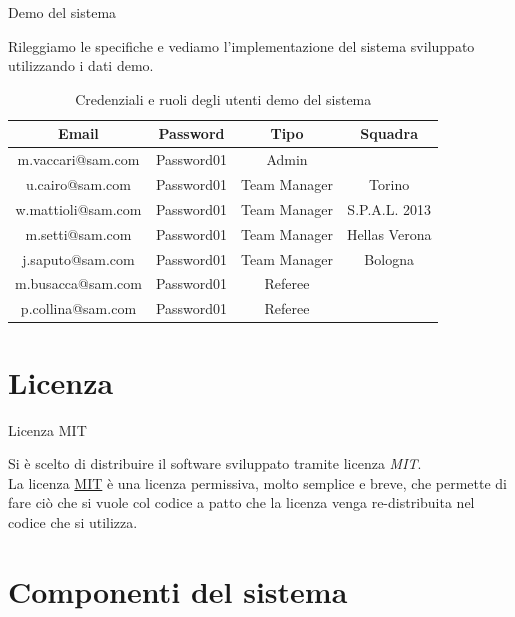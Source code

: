 \documentclass[10pt]{beamer}
\begin{document}
\begin{frame}{Demo del sistema}

Rileggiamo le specifiche e vediamo l’implementazione del sistema sviluppato utilizzando i dati demo.

\begin{table}
	\caption{Credenziali e ruoli degli utenti demo del sistema}
    \begin{tabular}{c c c c}
      \toprule
      Email & Password& Tipo & Squadra\\
      \midrule
	m.vaccari@sam.com & Password01 & Admin \\
	u.cairo@sam.com & Password01 & Team Manager & Torino \\
	w.mattioli@sam.com & Password01 & Team Manager & S.P.A.L. 2013 \\
	m.setti@sam.com & Password01 & Team Manager & Hellas Verona \\
	j.saputo@sam.com & Password01 & Team Manager & Bologna \\
	m.busacca@sam.com & Password01 & Referee \\
	p.collina@sam.com & Password01  & Referee \\
      \bottomrule
    \end{tabular}
  \end{table}

\end{frame}


\section{Licenza}

\begin{frame}{Licenza MIT}

Si è scelto di distribuire il software sviluppato tramite licenza \emph{MIT}.\\
La licenza \href{https://mit-license.org/}{MIT} è una licenza permissiva, molto semplice e breve, che permette di fare ciò che si vuole col codice a patto che la licenza venga re-distribuita nel codice che si utilizza.

\end{frame}

\section{Componenti del sistema}
\end{document}
